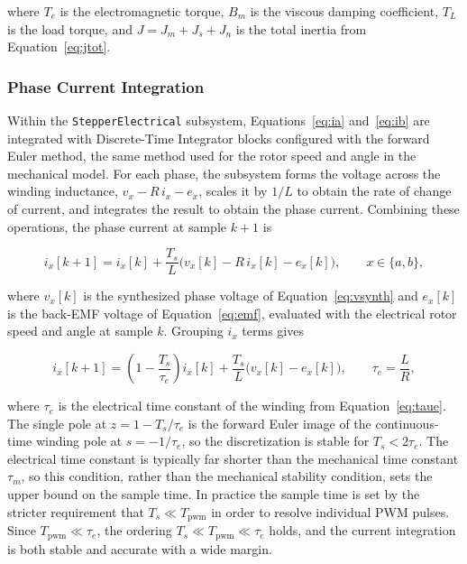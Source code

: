 where $T_e$ is the electromagnetic torque, $B_m$ is the viscous damping coefficient, $T_L$ is the load torque, and $J = J_m + J_s + J_n$ is the total inertia from Equation~\eqref{eq:jtot}.

\subsubsection{Phase Current Integration}\label{sec:phaseIntegration}

Within the \texttt{StepperElectrical} subsystem,
Equations~\eqref{eq:ia} and~\eqref{eq:ib} are integrated with Discrete-Time Integrator blocks configured with the forward Euler method, the same method used for the rotor speed and angle in the mechanical model. For each phase, the subsystem forms the voltage across the winding inductance, $v_x - R\,i_x - e_x$, scales it by $1/L$ to obtain the rate of change of current, and integrates the result to obtain the phase current. Combining these operations, the phase current at sample $k+1$ is

\begin{equation}
	i_x[k+1] = i_x[k] + \frac{T_s}{L}\Big( v_x[k] - R\, i_x[k] - e_x[k] \Big),
	\qquad x \in \{a, b\},
	\label{eq:current_update}
\end{equation}

where $v_x[k]$ is the synthesized phase voltage of Equation~\eqref{eq:vsynth} and $e_x[k]$ is the back-EMF voltage of Equation~\eqref{eq:emf}, evaluated with the electrical rotor speed and angle at sample $k$. Grouping $i_x$ terms gives

\begin{equation}
	i_x[k+1] = \left( 1 - \frac{T_s}{\tau_e} \right) i_x[k]
	+ \frac{T_s}{L}\Big( v_x[k] - e_x[k] \Big),
	\qquad \tau_e = \frac{L}{R},
	\label{eq:current_pole}
\end{equation}

where $\tau_e$ is the electrical time constant of the winding from
Equation~\eqref{eq:taue}. The single pole at $z = 1 - T_s/\tau_e$ is the
forward Euler image of the continuous-time winding pole at $s = -1/\tau_e$,
so the discretization is stable for $T_s < 2\tau_e$. The electrical time
constant is typically far shorter than the mechanical time constant $\tau_m$,
so this condition, rather than the mechanical stability condition, sets the
upper bound on the sample time. In practice the sample time is set by the
stricter requirement that $T_s \ll T_{\mathrm{pwm}}$ in order to resolve
individual PWM pulses. Since $T_{\mathrm{pwm}} \ll \tau_e$, the ordering
$T_s \ll T_{\mathrm{pwm}} \ll \tau_e$ holds, and the current integration is
both stable and accurate with a wide margin.

